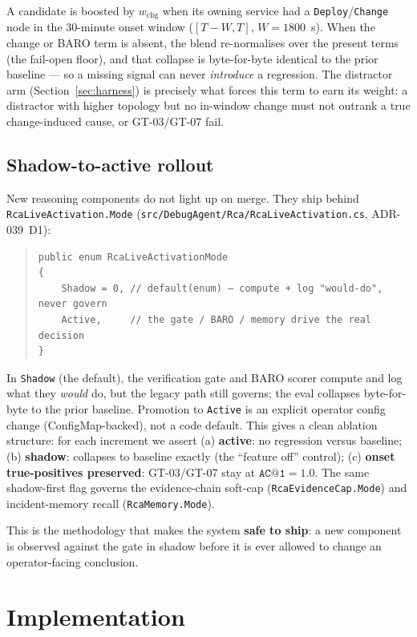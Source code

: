\documentclass[11pt]{article}
\makeatletter
\newcommand{\acone}{\texttt{AC@1}}
\newcommand{\code}[1]{\texttt{#1}}
\makeatother
\begin{document}
A candidate is boosted by $w_{\text{chg}}$ when its owning service had a
\code{Deploy}/\code{Change} node in the 30-minute onset window ($[T-W, T]$, $W = 1800$~s).
When the change or BARO term is absent, the blend re-normalises over the present terms (the
fail-open floor), and that collapse is byte-for-byte identical to the prior baseline --- so a
missing signal can never \emph{introduce} a regression. The distractor arm
(Section~\ref{sec:harness}) is precisely what forces this term to earn its weight: a
distractor with higher topology but no in-window change must not outrank a true
change-induced cause, or GT-03/GT-07 fail.

\subsection{Shadow-to-active rollout}
\label{sec:shadow}

New reasoning components do not light up on merge. They ship behind
\code{RcaLiveActivation.Mode} (\code{src/DebugAgent/Rca/RcaLiveActivation.cs}, ADR-039~D1):

\begin{quote}
\begin{verbatim}
public enum RcaLiveActivationMode
{
    Shadow = 0, // default(enum) — compute + log "would-do", never govern
    Active,     // the gate / BARO / memory drive the real decision
}
\end{verbatim}
\end{quote}

In \code{Shadow} (the default), the verification gate and BARO scorer compute and log what
they \emph{would} do, but the legacy path still governs; the eval collapses byte-for-byte to
the prior baseline. Promotion to \code{Active} is an explicit operator config change
(ConfigMap-backed), not a code default. This gives a clean ablation structure: for each
increment we assert (a) \textbf{active}: no regression versus baseline; (b) \textbf{shadow}:
collapses to baseline exactly (the ``feature off'' control); (c) \textbf{onset
true-positives preserved}: GT-03/GT-07 stay at $\acone{} = 1.0$. The same shadow-first flag
governs the evidence-chain soft-cap (\code{RcaEvidenceCap.Mode}) and incident-memory recall
(\code{RcaMemory.Mode}).

This is the methodology that makes the system \textbf{safe to ship}: a new component is
observed against the gate in shadow before it is ever allowed to change an operator-facing
conclusion.

\section{Implementation}
\label{sec:impl}
\end{document}
